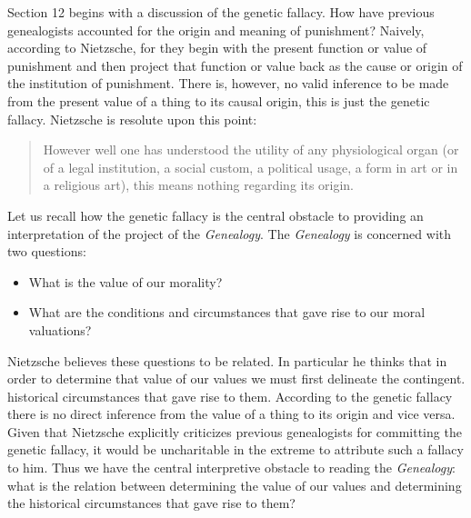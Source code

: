 Section 12 begins with a discussion of the genetic fallacy. How have previous genealogists accounted for the origin and meaning of punishment? Naively, according to Nietzsche, for they begin with the present function or value of punishment and then project that function or value back as the cause or origin of the institution of punishment. There is, however, no valid inference to be made from the present value of a thing to its causal origin, this is just the genetic fallacy. Nietzsche is resolute upon this point:
\begin{quote}
	However well one has understood the utility of any physiological organ (or of a legal institution, a social custom, a political usage, a form in art or in a religious art), this means nothing regarding its origin.
\end{quote}
Let us recall how the genetic fallacy is the central obstacle to providing an interpretation of the project of the \emph{Genealogy}. The \emph{Genealogy} is concerned with two questions: 
\begin{itemize}
	\item What is the value of our morality? 
	\item What are the conditions and circumstances that gave rise to our moral valuations? 
\end{itemize}
Nietzsche believes these questions to be related. In particular he thinks that in order to determine that value of our values we must first delineate the contingent. historical circumstances that gave rise to them. According to the genetic fallacy there is no direct inference from the value of a thing to its origin and vice versa. Given that Nietzsche explicitly criticizes previous genealogists for committing the genetic fallacy, it would be uncharitable in the extreme to attribute such a fallacy to him. Thus we have the central interpretive obstacle to reading the \emph{Genealogy}: what is the relation between determining the value of our values and determining the historical circumstances that gave rise to them?

